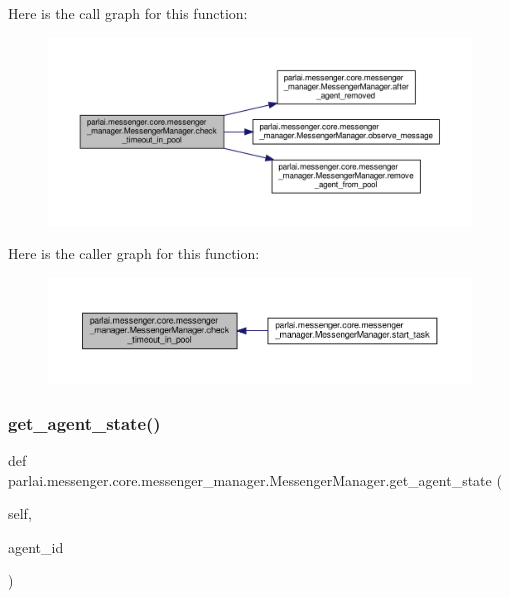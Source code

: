 Here is the call graph for this function\+:
\nopagebreak
\begin{figure}[H]
\begin{center}
\leavevmode
\includegraphics[width=350pt]{classparlai_1_1messenger_1_1core_1_1messenger__manager_1_1MessengerManager_ac1f17ccc47844361a32ca3da63ae1c3e_cgraph}
\end{center}
\end{figure}
Here is the caller graph for this function\+:
\nopagebreak
\begin{figure}[H]
\begin{center}
\leavevmode
\includegraphics[width=350pt]{classparlai_1_1messenger_1_1core_1_1messenger__manager_1_1MessengerManager_ac1f17ccc47844361a32ca3da63ae1c3e_icgraph}
\end{center}
\end{figure}
\mbox{\label{classparlai_1_1messenger_1_1core_1_1messenger__manager_1_1MessengerManager_aad51f1633f4d56d2a8812562f0608e03}} 
\subsubsection{\texorpdfstring{get\+\_\+agent\+\_\+state()}{get\_agent\_state()}}
{\footnotesize\ttfamily def parlai.\+messenger.\+core.\+messenger\+\_\+manager.\+Messenger\+Manager.\+get\+\_\+agent\+\_\+state (\begin{DoxyParamCaption}\item[{}]{self,  }\item[{}]{agent\+\_\+id }\end{DoxyParamCaption})}

